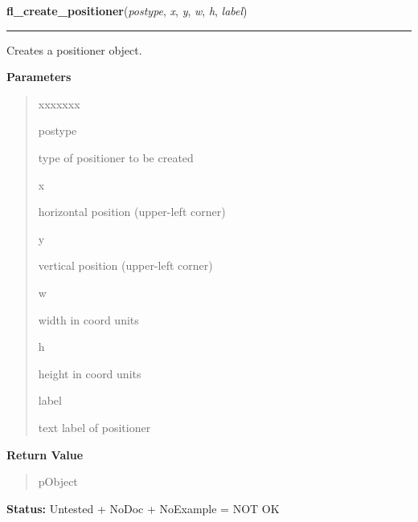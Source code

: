     \label{xformslib:library:fl_create_positioner}

    \vspace{0.5ex}

\hspace{.8\funcindent}\begin{boxedminipage}{\funcwidth}

    \raggedright \textbf{fl\_create\_positioner}(\textit{postype}, \textit{x}, \textit{y}, \textit{w}, \textit{h}, \textit{label})

    \vspace{-1.5ex}

    \rule{\textwidth}{0.5\fboxrule}
\setlength{\parskip}{2ex}
    Creates a positioner object.

\setlength{\parskip}{1ex}
      \textbf{Parameters}
      \vspace{-1ex}

      \begin{quote}
        \begin{Ventry}{xxxxxxx}

          \item[postype]

          type of positioner to be created

          \item[x]

          horizontal position (upper-left corner)

          \item[y]

          vertical position (upper-left corner)

          \item[w]

          width in coord units

          \item[h]

          height in coord units

          \item[label]

          text label of positioner

        \end{Ventry}

      \end{quote}

      \textbf{Return Value}
    \vspace{-1ex}

      \begin{quote}
      pObject

      \end{quote}

\textbf{Status:} Untested + NoDoc + NoExample = NOT OK



    \end{boxedminipage}

